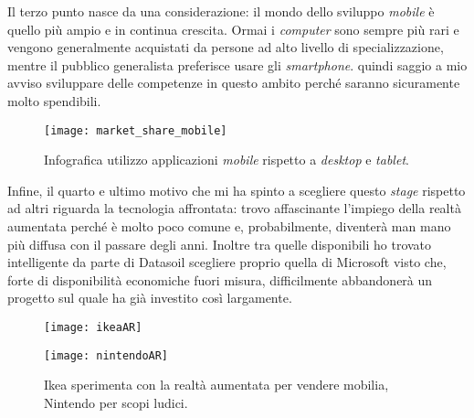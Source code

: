 Il terzo punto nasce da una considerazione: il mondo dello sviluppo \textit{mobile} è quello più ampio e in continua crescita. Ormai i \textit{computer} sono sempre più rari e vengono generalmente acquistati da persone ad alto livello di specializzazione, mentre il pubblico generalista preferisce usare gli \textit{smartphone}. \e quindi saggio a mio avviso sviluppare delle competenze in questo ambito perché saranno sicuramente molto spendibili.
\begin{figure}[H]
    \centering
    \texttt{[image: market\_share\_mobile]}
    \caption[\textit{Market share} \textit{desktop} e \textit{mobile}]{Infografica utilizzo applicazioni \textit{mobile} rispetto a \textit{desktop} e \textit{tablet}.\footnotemark}
\end{figure}
Infine, il quarto e ultimo motivo che mi ha spinto a scegliere questo \textit{stage} rispetto ad altri riguarda la tecnologia affrontata: trovo affascinante l'impiego della realtà aumentata perché è molto poco comune e, probabilmente, diventerà man mano più diffusa con il passare degli anni. Inoltre tra quelle disponibili ho trovato intelligente da parte di Datasoil scegliere proprio quella di Microsoft visto che, forte di disponibilità economiche fuori misura, difficilmente abbandonerà un progetto sul quale ha già investito così largamente.
\begin{figure}[H]
    \centering
    \begin{minipage}{.5\textwidth}
      \centering
      \texttt{[image: ikeaAR]}
      \label{fig:test1}
    \end{minipage}%
    \begin{minipage}{.5\textwidth}
      \centering
      \texttt{[image: nintendoAR]}
    \end{minipage}
    \caption[Ikea e Nintendo usano realtà aumentata]{Ikea sperimenta con la realtà aumentata per vendere mobilia, Nintendo per scopi ludici.\footnotemark}
\end{figure}

